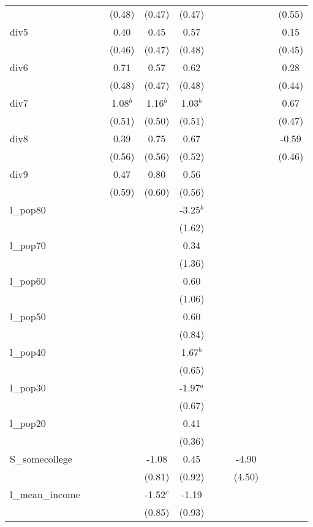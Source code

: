\documentclass[]{article}
\begin{document}
\begin{tabular}{lcccccccccc}
 &  &  & (0.48) & (0.47) & (0.47) &  &  &  &  & (0.55) \\
div5 &  &  & 0.40 & 0.45 & 0.57 &  &  &  &  & 0.15 \\
 &  &  & (0.46) & (0.47) & (0.48) &  &  &  &  & (0.45) \\
div6 &  &  & 0.71 & 0.57 & 0.62 &  &  &  &  & 0.28 \\
 &  &  & (0.48) & (0.47) & (0.48) &  &  &  &  & (0.44) \\
div7 &  &  & 1.08$^b$ & 1.16$^b$ & 1.03$^b$ &  &  &  &  & 0.67 \\
 &  &  & (0.51) & (0.50) & (0.51) &  &  &  &  & (0.47) \\
div8 &  &  & 0.39 & 0.75 & 0.67 &  &  &  &  & -0.59 \\
 &  &  & (0.56) & (0.56) & (0.52) &  &  &  &  & (0.46) \\
div9 &  &  & 0.47 & 0.80 & 0.56 &  &  &  &  &  \\
 &  &  & (0.59) & (0.60) & (0.56) &  &  &  &  &  \\
l\_pop80 &  &  &  &  & -3.25$^b$ &  &  &  &  &  \\
 &  &  &  &  & (1.62) &  &  &  &  &  \\
l\_pop70 &  &  &  &  & 0.34 &  &  &  &  &  \\
 &  &  &  &  & (1.36) &  &  &  &  &  \\
l\_pop60 &  &  &  &  & 0.60 &  &  &  &  &  \\
 &  &  &  &  & (1.06) &  &  &  &  &  \\
l\_pop50 &  &  &  &  & 0.60 &  &  &  &  &  \\
 &  &  &  &  & (0.84) &  &  &  &  &  \\
l\_pop40 &  &  &  &  & 1.67$^b$ &  &  &  &  &  \\
 &  &  &  &  & (0.65) &  &  &  &  &  \\
l\_pop30 &  &  &  &  & -1.97$^a$ &  &  &  &  &  \\
 &  &  &  &  & (0.67) &  &  &  &  &  \\
l\_pop20 &  &  &  &  & 0.41 &  &  &  &  &  \\
 &  &  &  &  & (0.36) &  &  &  &  &  \\
S\_somecollege &  &  &  & -1.08 & 0.45 &  &  & -4.90 &  &  \\
 &  &  &  & (0.81) & (0.92) &  &  & (4.50) &  &  \\
l\_mean\_income &  &  &  & -1.52$^c$ & -1.19 &  &  &  &  &  \\
 &  &  &  & (0.85) & (0.93) &  &  &  &  &  \\

\end{tabular}
\end{document}
